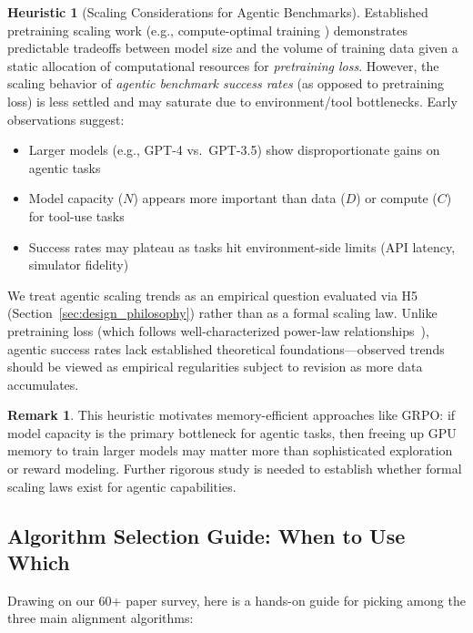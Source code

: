 \documentclass[12pt,a4paper]{report}
\theoremstyle{definition}
\newtheorem{remark}[theorem]{Remark}
\newtheorem{heuristic}[theorem]{Heuristic}
\begin{document}
\begin{heuristic}[Scaling Considerations for Agentic Benchmarks]
\label{lem:scaling}
Established pretraining scaling work (e.g., compute-optimal training \cite{hoffmann2022training}) demonstrates predictable tradeoffs between model size and the volume of training data given a static allocation of computational resources for \emph{pretraining loss}.
 However, the scaling behavior of \emph{agentic benchmark success rates} (as opposed to pretraining loss) is less settled and may saturate due to environment/tool bottlenecks. Early observations suggest:
\begin{itemize}
    \item Larger models (e.g., GPT-4 vs.\ GPT-3.5) show disproportionate gains on agentic tasks
    \item Model capacity ($N$) appears more important than data ($D$) or compute ($C$) for tool-use tasks
    \item Success rates may plateau as tasks hit environment-side limits (API latency, simulator fidelity)
\end{itemize}
We treat agentic scaling trends as an empirical question evaluated via H5 (Section~\ref{sec:design_philosophy}) rather than as a formal scaling law. Unlike pretraining loss (which follows well-characterized power-law relationships~\cite{hoffmann2022training}), agentic success rates lack established theoretical foundations---observed trends should be viewed as empirical regularities subject to revision as more data accumulates.
\end{heuristic}

\begin{remark}
This heuristic motivates memory-efficient approaches like GRPO: if model capacity is the primary bottleneck for agentic tasks, then freeing up GPU memory to train larger models may matter more than sophisticated exploration or reward modeling. Further rigorous study is needed to establish whether formal scaling laws exist for agentic capabilities.
\end{remark}

\subsection{Algorithm Selection Guide: When to Use Which}
Drawing on our 60+ paper survey, here is a hands-on guide for picking among the three main alignment algorithms:
\end{document}
